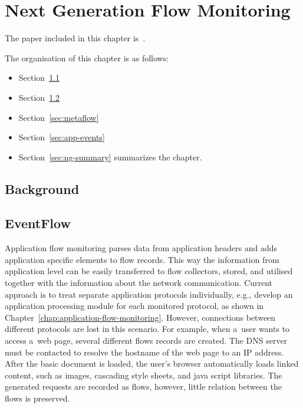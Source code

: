 \chapter{Next Generation Flow Monitoring}\label{chap:next-generation-flow}

\begin{chapintro}




The paper included in this chapter is~\cite{Velan-2016-EventFlow}.

The organisation of this chapter is as follows:
\begin{itemize}
  \item Section~\ref{sec:ng-background}
  \item Section~\ref{sec:eventflow} 
  \item Section~\ref{sec:metaflow} 
  \item Section~\ref{sec:app-events} 
  \item Section~\ref{sec:ng-summary} summarizes the chapter.
\end{itemize}

\end{chapintro}

\newpage


\section{Background}\label{sec:ng-background}

\section{EventFlow}\label{sec:eventflow}

Application flow monitoring parses data from application headers and adds application specific elements to flow records. This way the information from application level can be easily transferred to flow collectors, stored, and utilised together with the information about the network communication. Current approach is to treat separate application protocols individually, e.g., develop an application processing module for each monitored protocol, as shown in Chapter~\ref{chap:application-flow-monitoring}. However, connections between different protocols are lost in this scenario. For example, when a~user wants to access a~web page, several different flows records are created. The DNS server must be contacted to resolve the hostname of the web page to an IP address. After the basic document is loaded, the user's browser automatically loads linked content, such as images, cascading style sheets, and java script libraries. The generated requests are recorded as flows, however, little relation between the flows is preserved.

